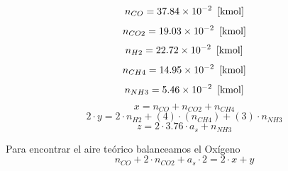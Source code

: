 \documentclass{article}
\theoremstyle{mytheoremstyle}
\theoremstyle{mytheoremstyle}
\theoremstyle{myproblemstyle}
\begin{document}
    \begin{equation}
        \label{EES Eqn:8}
        n_{CO} = 37.84\times 10^{-2}   \   \left[ \rm kmol \right] 
        \end{equation}
        {\color{blue} \rm}
        \begin{equation}
        \label{EES Eqn:9}
        n_{CO2} = 19.03\times 10^{-2}   \   \left[ \rm kmol \right] 
        \end{equation}
        {\color{blue} \rm}
        \begin{equation}
        \label{EES Eqn:10}
        n_{H2} = 22.72\times 10^{-2}   \   \left[ \rm kmol \right] 
        \end{equation}
        {\color{blue} \rm}
        \begin{equation}
        \label{EES Eqn:11}
        n_{CH4} = 14.95\times 10^{-2}   \   \left[ \rm kmol \right] 
        \end{equation}
        {\color{blue} \rm}
        \begin{equation}
        \label{EES Eqn:12}
        n_{NH3} = 5.46\times 10^{-2}   \   \left[ \rm kmol \right] 
        \end{equation}
        {\color{blue} \rm}
        \begin{equation}
        \label{EES Eqn:13}
        x = n_{CO} + n_{CO2} + n_{CH4} 
        \end{equation}
        \begin{equation}
        \label{EES Eqn:14}
        2\cdot y = 2\cdot n_{H2} +  \left( 4 \right) \cdot  \left( n_{CH4} \right)  +  \left( 3 \right) \cdot n_{NH3} 
        \end{equation}
        \begin{equation}
        \label{EES Eqn:15}
        z = 2 \cdot  3.76 \cdot  a_{s} + n_{NH3} 
        \end{equation}
        
        \vspace{0.10in}
        \noindent
        {\color{blue} \rm Para encontrar el aire teórico balanceamos el Oxígeno}
        \begin{equation}
        \label{EES Eqn:16}
        n_{CO} + 2\cdot n_{CO2} + a_{s}\cdot 2 = 2\cdot x + y 
        \end{equation}
       
\end{document}
